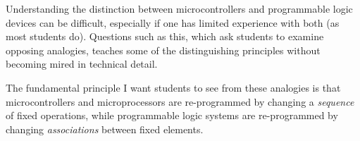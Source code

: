 
Understanding the distinction between microcontrollers and programmable logic devices can be difficult, especially if one has limited experience with both (as most students do).  Questions such as this, which ask students to examine opposing analogies, teaches some of the distinguishing principles without becoming mired in technical detail.

The fundamental principle I want students to see from these analogies is that microcontrollers and microprocessors are re-programmed by changing a {\it sequence} of fixed operations, while programmable logic systems are re-programmed by changing {\it associations} between fixed elements.




